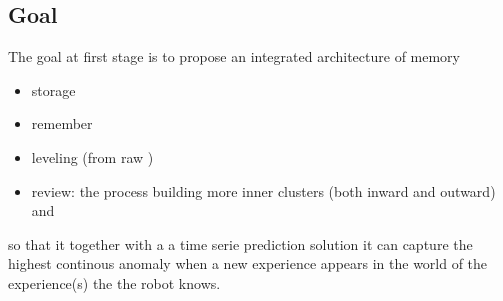 \subsection{Goal}
The goal at first stage is to propose an integrated architecture of memory
\begin{itemize}
    \item storage
    \item remember
    \item leveling (from raw )
    \item review: the process building more inner clusters (both inward and outward) and
\end{itemize}
so that it together with a a time serie prediction solution it can capture the highest continous anomaly when a new experience appears in the world of the experience(s) the the robot knows.